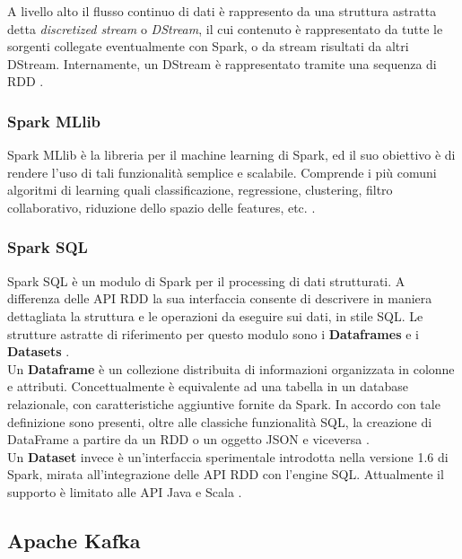 \documentclass[12pt]{article}
\begin{document}
A livello alto il flusso continuo di dati è rappresento da una struttura astratta detta \textit{discretized stream} o \textit{DStream}, il cui contenuto è rappresentato da tutte le sorgenti collegate eventualmente con Spark, o da stream risultati da altri DStream. Internamente, un DStream è rappresentato tramite una sequenza di RDD \cite{spark}. 

\subsubsection{Spark MLlib}

Spark MLlib è la libreria per il machine learning di Spark, ed il suo obiettivo è di rendere l'uso di tali funzionalità semplice e scalabile. Comprende i più comuni algoritmi di learning quali classificazione, regressione, clustering, filtro collaborativo, riduzione dello spazio delle features, etc. \cite{spark}. 

\subsubsection{Spark SQL}

Spark SQL è un modulo di Spark per il processing di dati strutturati. A differenza delle API RDD la sua interfaccia consente di descrivere in maniera dettagliata la struttura e le operazioni da eseguire sui dati, in stile SQL. Le strutture astratte di riferimento per questo modulo sono i \textbf{Dataframes} e i \textbf{Datasets} \cite{spark}.\\

Un \textbf{Dataframe} è un collezione distribuita di informazioni organizzata in colonne e attributi. Concettualmente è equivalente ad una tabella in un database relazionale, con caratteristiche aggiuntive fornite da Spark. In accordo con tale definizione sono presenti, oltre alle classiche funzionalità SQL, la creazione di DataFrame a partire da un RDD o un oggetto JSON e viceversa \cite{spark}.\\

Un \textbf{Dataset} invece è un'interfaccia sperimentale introdotta nella versione 1.6 di Spark, mirata all'integrazione delle API RDD con l'engine SQL. Attualmente il supporto è limitato alle API Java e Scala \cite{spark}.

\subsection{Apache Kafka}
\end{document}
